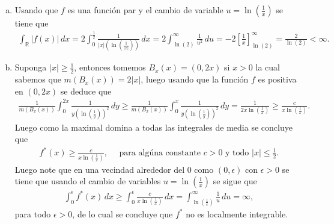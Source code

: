 \begin{solucion}
\begin{enumerate}[a)]
  \item Usando que $f$ es una función par y el cambio de variable $u=\ln\left( \frac{1}{x} \right)$ se tiene que
    \begin{align*}
      \int_{\mathbb{R}}|f(x)|\, dx=2\int_{0}^{\frac{1}{2}}\frac{1}{|x|\left( \ln\left( \frac{1}{|x|} \right) \right)}\, dx=2\int_{\ln(2)}^{\infty}\frac{1}{u^{2}}\, du=-2\left[ \frac{1}{x} \right]_{\ln(2)}^{\infty}=\frac{2}{\ln(2)}<\infty.
    \end{align*}
  \item Suponga $|x|\geq \frac{1}{2}$, entonces tomemos $B_{x}(x)=(0,2x)$ si $x>0$ la cual sabemos que $m(B_{x}(x))=2|x|$, luego usando que la función $f$ es positiva en $(0,2x)$ se deduce que 
    \begin{align*}
      \frac{1}{m(B_{x}(x))}\int_{0}^{2x}\frac{1}{y\left(\ln\left( \frac{1}{y} \right)\right)^{2}}\, dy\geq\frac{1}{m(B_{x}(x))}\int_{0}^{x}\frac{1}{y\left(\ln\left( \frac{1}{y} \right)\right)^{2}}\, dy=\frac{1}{2x\ln\left( \frac{1}{x} \right)}\geq\frac{c}{x\ln\left( \frac{1}{x} \right)}.
    \end{align*}
    Luego como la maximal domina a todas las integrales de media se concluye que
    \begin{align*}
      f^{\ast}(x)\geq \frac{c}{x\ln\left( \frac{1}{x} \right)},\quad\text{ para algúna constante $c>0$ y todo $|x|\leq \frac{1}{2}$.}
    \end{align*}
    Luego note que en una vecindad alrededor del $0$ como $(0,\epsilon)$ con $\epsilon >0$ se tiene que usando el cambio de variables $u=\ln\left( \frac{1}{x} \right)$ se sigue que 
    \begin{align*}
      \int_{0}^{\epsilon}f^{\ast}(x)\, dx\geq \int_{0}^{\epsilon}\frac{c}{x\ln\left( \frac{1}{x} \right)}\, dx=\int_{\ln\left( \frac{1}{\epsilon} \right)}^{\infty}\frac{1}{u}\, du=\infty,
    \end{align*}
    para todo $\epsilon>0$, de lo cual se concluye que $f^{\ast}$ no es localmente integrable. 
\end{enumerate}
\end{solucion}
